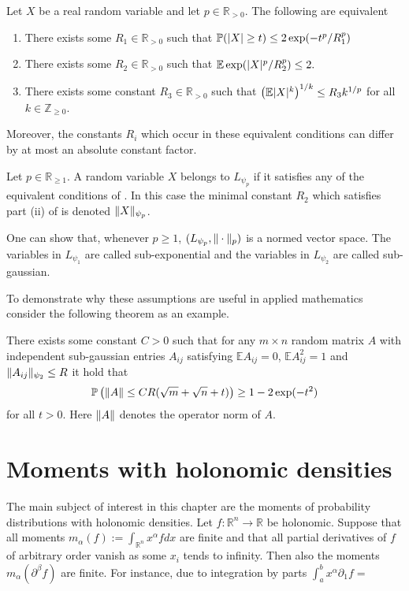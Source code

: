 \begin{theorem}{\cite[Proof of Proposition 2.5.2]{vershynin2018high}}\label{thm: EquivalentLp}
  Let $X$ be a real random variable and let $p\in \mathbb{R}_{>0}$. The following are equivalent
  \begin{enumerate}[label = (\roman*)]
    \item There exists some $R_1\in \mathbb{R}_{>0}$ such that $\mathbb{P}(\vert X \vert\geq t) \leq 2\exp(-t^p/R_1^p)$
    \item There exists some $R_2\in \mathbb{R}_{>0}$ such that $\mathbb{E}\exp(\vert X \vert^p/R_2^p) \leq 2.$
    \item There exists some constant $R_3\in \mathbb{R}_{>0}$ such that $\left(\mathbb{E} \vert X \vert^k \right)^{1/k} \leq R_3k^{1/p}$
    for all $k\in \mathbb{Z}_{\geq 0}$.
  \end{enumerate}
  Moreover, the constants $R_i$ which occur in these equivalent conditions can differ by at most an absolute constant factor.
\end{theorem}
\begin{definition}
  Let $p\in \mathbb{R}_{\geq 1}$.
  A random variable $X$ belongs to $L_{\psi_p}$ if it satisfies any of the equivalent conditions of .
  In this case the minimal constant $R_2$ which satisfies part (ii) of  is denoted $\Vert X \Vert_{\psi_p}$.
\end{definition}
\begin{remark}
  One can show that, whenever $p\geq 1$, $(L_{\psi_p},\Vert \cdot \Vert_p)$ is a normed vector space.
  The variables in $L_{\psi_1}$ are called sub-exponential and the variables in $L_{\psi_2}$ are called sub-gaussian.
\end{remark}

To demonstrate why these assumptions are useful in applied mathematics consider the following theorem as an example.
\begin{theorem}{\cite[Theorem 4.4.5]{vershynin2018high}}
  There exists some constant $C>0$ such that for any  $m\times n$ random matrix $A$ with independent sub-gaussian entries $A_{ij}$ satisfying $\mathbb{E}A_{ij} = 0$, $\mathbb{E}A_{ij}^2 = 1$ and $\Vert A_{ij} \Vert_{\psi_2}\leq R$
  it hold that
  $$\mathbb{P}\left(\Vert A \Vert \leq  CR(\sqrt{m} + \sqrt{n} + t)\right) \geq 1-2\exp(-t^2)$$
  for all $t>0$.
  Here $\Vert A \Vert$ denotes the operator norm of $A$.
\end{theorem}

\section{Moments with holonomic densities}\label{sec: RecursionMoment}
The main subject of interest in this chapter are the moments of probability distributions with holonomic densities.
Let $f:\mathbb{R}^n \to \mathbb{R}$ be holonomic.
Suppose that all moments $m_\alpha(f) := \int_{\mathbb{R}^n} x^\alpha f dx$ are finite and that all partial derivatives of $f$ of arbitrary order vanish as some $x_i$ tends to infinity.
Then also the moments $m_\alpha(\partial^\beta f)$ are finite.
For instance, due to integration by parts $\int_a^{b} x^\alpha \partial_1 f = $
